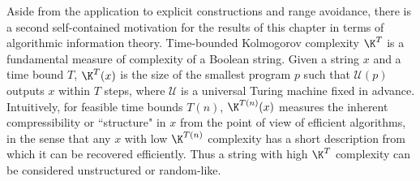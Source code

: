 Aside from the application to explicit constructions and range avoidance, there is a second self-contained motivation for the results of this chapter in terms of algorithmic information theory. Time-bounded Kolmogorov complexity $\K^T$ \cite{LV19} is a fundamental measure of complexity of a Boolean string. Given a string $x$ and a time bound $T$, $\K^T(x)$ is the size of the smallest program $p$ such that $\mathcal{U}(p)$ outputs $x$ within $T$ steps, where $\mathcal{U}$ is a universal Turing machine fixed in advance. Intuitively, for feasible time bounds $T(n)$, $\K^{T(n)}(x)$ measures the inherent compressibility or ``structure" in $x$ from the point of view of efficient algorithms, in the sense that any $x$ with low $\K^{T(n)}$ complexity has a short description from which it can be recovered efficiently. Thus a string with high $\K^T$ complexity can be considered unstructured or random-like.

